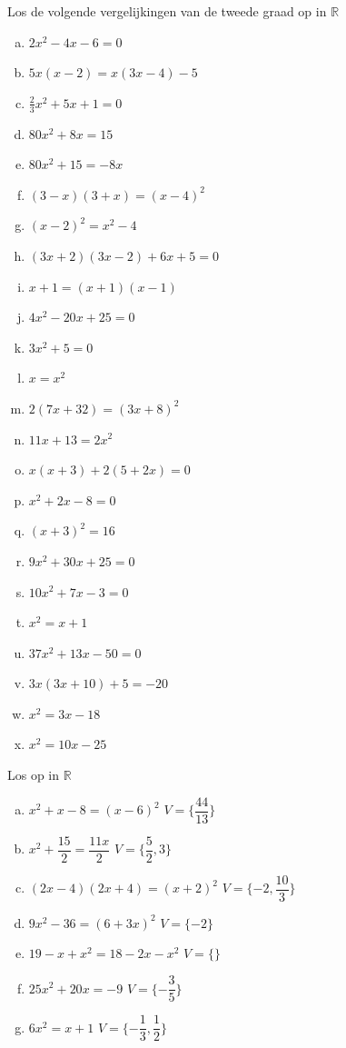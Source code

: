 \documentclass[12pt,twoside,a4paper]{article}
\begin{document}
\begin{oefening}
  Los de volgende vergelijkingen van de tweede graad op in $\mathbb{R}$
  \begin{multicols}{2}
    \begin{enumerate}[(a)]
    \itemsep0.8em
    \item $2x^2-4x-6=0$
    \item $5x(x-2)=x(3x-4)-5$
    \item $\frac{2}{3}x^2+5x+1=0$
    \item $80x^2+8x=15$
    \item $80x^2+15=-8x$
    \item $(3-x)(3+x)=(x-4)^2$
    \item $(x-2)^2=x^2-4$
    \item $(3x+2)(3x-2)+6x+5=0$
    \item $x+1=(x+1)(x-1)$
    \item $4x^2-20x+25=0$
    \item $3x^2+5=0$
    \item $x=x^2$
    \item $2\left(7x+32\right)=(3x+8)^2$
    \item $11x+13=2x^2$
    \item $x\left(x+3\right)+2\left(5+2x\right)=0$
    \item $x^2+2x-8=0$
    \item $(x+3)^2=16$
    \item $9x^2+30x+25=0$
    \item $10x^2+7x-3=0$
    \item $x^2=x+1$
    \item $37x^2+13x-50=0$
    \item $3x(3x+10)+5=-20$
    \item $x^2=3x-18$
    \item $x^2=10x-25$
    \end{enumerate}
  \end{multicols}
\end{oefening}

\begin{oefening}
  Los op in $\mathbb{R}$
  \begin{enumerate}[(a)]
      \itemsep1em
    \item $x^2+x-8=(x-6)^2$ \tabto{6cm} {\color{gray}$V=\{\dfrac{44}{13}\}$}
    \item $x^2+\dfrac{15}{2}=\dfrac{11x}{2}$ \tabto{6cm} {\color{gray}$V=\{\dfrac{5}{2}, 3\}$}
    \item $(2x-4)(2x+4)=(x+2)^2$ \tabto{6cm} {\color{gray}$V=\{-2,\dfrac{10}{3}\}$}
    \item $9x^2-36=(6+3x)^2$ \tabto{6cm} {\color{gray}$V=\{-2\}$}
    \item $19-x+x^2=18-2x-x^2$ \tabto{6cm} {\color{gray}$V=\{\}$}
    \item $25x^2+20x=-9$ \tabto{6cm} {\color{gray}$V=\{-\dfrac{3}{5}\}$}
    \item $6x^2=x+1$ \tabto{6cm} {\color{gray}$V=\{-\dfrac{1}{3},\dfrac{1}{2}\}$}
  \end{enumerate}
\end{oefening}
\end{document}
